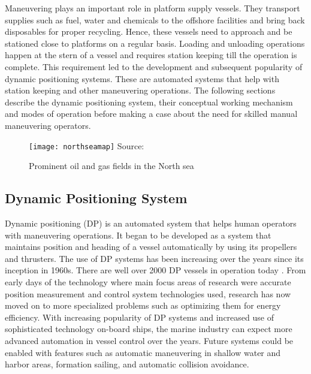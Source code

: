 Maneuvering plays an important role in platform supply vessels. They transport supplies such as fuel, water and chemicals to the offshore facilities and bring back disposables for proper recycling. Hence, these vessels need to approach and be stationed close to platforms on a regular basis. Loading and unloading operations happen at the stern of a vessel and requires station keeping till the operation is complete. This requirement led to the development and subsequent popularity of dynamic positioning systems. These are automated systems that help with station keeping and other maneuvering operations. The following sections describe the dynamic positioning system, their conceptual working mechanism and modes of operation before making a case about the need for skilled manual maneuvering operators.

\begin{figure}
	\centering
	\caption{Prominent oil and gas fields in the North sea}
	\texttt{[image: northseamap]}
	\label{fig:northseamap}
	\hbox{\small Source: }
\end{figure}

\subsection{Dynamic Positioning System}

Dynamic positioning (DP) is an automated system that helps human operators with maneuvering operations. It began to be developed as a system that maintains position and heading of a vessel automatically by using its propellers and thrusters. The use of DP systems has been increasing over the years since its inception in 1960s. There are well over 2000 DP vessels in operation today \parencite{sorensen2011survey}. From early days of the technology where main focus areas of research were accurate position measurement and control system technologies used, research has now moved on to more specialized problems such as optimizing them for energy efficiency. With increasing popularity of DP systems and increased use of sophisticated technology on-board ships, the marine industry can expect more advanced automation in vessel control over the years. Future systems could be enabled with features such as automatic maneuvering in shallow water and harbor areas, formation sailing, and automatic collision avoidance.

